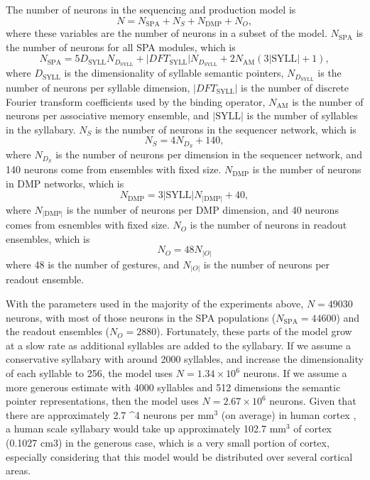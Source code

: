 The number of neurons in the
sequencing and production model is
\begin{equation}
  N = N_{\text{SPA}} + N_S + N_{\text{DMP}} + N_O,
\end{equation}
where these variables
are the number of neurons in
a subset of the model.
$N_{\text{SPA}}$ is the number of
neurons for all SPA modules,
which is
\begin{equation}
  N_{\text{SPA}} = 5 D_{\text{SYLL}} N_D_{\text{SYLL}} +
      |DFT_{\text{SYLL}}| N_D_{\text{SYLL}}
      + 2 N_{\text{AM}} (3 |\text{SYLL}| + 1),
\end{equation}
where $D_{\text{SYLL}}$ is the dimensionality
of syllable semantic pointers,
$N_D_{\text{SYLL}}$ is the number of neurons
per syllable dimension,
$|DFT_{\text{SYLL}}|$ is the number of
discrete Fourier transform coefficients
used by the binding operator,
$N_{\text{AM}}$ is the number of neurons
per associative memory ensemble,
and $|\text{SYLL}|$ is the number of
syllables in the syllabary.
$N_S$ is the number of neurons
in the sequencer network,
which is
\begin{equation}
  N_S = 4 N_D_S + 140,
\end{equation}
where $N_D_S$ is the number of neurons
per dimension in the sequencer network,
and 140 neurons come from ensembles
with fixed size.
$N_{\text{DMP}}$ is the number of neurons
in DMP networks, which is
\begin{equation}
  N_{\text{DMP}} = 3 |\text{SYLL}| N_{|\text{DMP}|} + 40,
\end{equation}
where $N_{|\text{DMP}|}$ is the number of neurons
per DMP dimension,
and 40 neurons comes from esnembles with fixed size.
$N_O$ is the number of neurons
in readout ensembles, which is
\begin{equation}
  N_O = 48 N_{|O|}
\end{equation}
where 48 is the number of gestures,
and $N_{|O|}$ is the number of neurons
per readout ensemble.

With the parameters used
in the majority of the experiments above,
$N=49030$ neurons,
with most of those neurons
in the SPA populations
($N_{\text{SPA}}=44600$)
and the readout ensembles ($N_O=2880$).
Fortunately, these parts of the model
grow at a slow rate
as additional syllables are added
to the syllabary.
If we assume a conservative syllabary
with around 2000 syllables,
and increase the dimensionality
of each syllable to 256,
the model uses
$N=1.34 \times 10^6$ neurons.
If we assume a more generous estimate
with 4000 syllables
and 512 dimensions
the semantic pointer representations,
then the model uses
$N=2.67 \times 10^6$ neurons.
Given that there are approximately
2.7 ^4 neurons per mm$^3$ (on average)
in human cortex \cite[BNID 112050]{milo2010},
a human scale syllabary would take up
approximately 102.7 mm$^3$ of cortex
(0.1027 cm$3$)
in the generous case,
which is a very small portion of cortex,
especially considering that this model
would be distributed over
several cortical areas.

